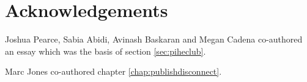 \documentclass[
	fontsize=10pt, %
	twoside=false, %
	secnumdepth=1, %
]{kaobook}
\begin{document}
\appendix %



\chapter*{Acknowledgements}

Joshua Pearce, Sabia Abidi, Avinash Baskaran and Megan Cadena co-authored an essay which was the basis of section \ref{sec:piheclub}.

Marc Jones co-authored chapter \ref{chap:publishdisconnect}.


\backmatter %



\printbibliography[heading=bibintoc, title=Bibliography, prenote=bibnote] %



\printindex %
\end{document}
